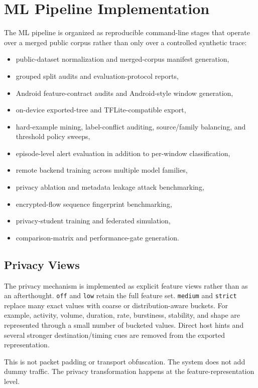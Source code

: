 \section{ML Pipeline Implementation}
The ML pipeline is organized as reproducible command-line stages that operate over a merged public
corpus rather than only over a controlled synthetic trace:
\begin{itemize}[leftmargin=*]
  \item public-dataset normalization and merged-corpus manifest generation,
  \item grouped split audits and evaluation-protocol reports,
  \item Android feature-contract audits and Android-style window generation,
  \item on-device exported-tree and TFLite-compatible export,
  \item hard-example mining, label-conflict auditing, source/family balancing, and threshold policy
  sweeps,
  \item episode-level alert evaluation in addition to per-window classification,
  \item remote backend training across multiple model families,
  \item privacy ablation and metadata leakage attack benchmarking,
  \item encrypted-flow sequence fingerprint benchmarking,
  \item privacy-student training and federated simulation,
  \item comparison-matrix and performance-gate generation.
\end{itemize}

\subsection{Privacy Views}
The privacy mechanism is implemented as explicit feature views rather than as an afterthought.
\texttt{off} and \texttt{low} retain the full feature set. \texttt{medium} and \texttt{strict}
replace many exact values with coarse or distribution-aware buckets. For example, activity, volume,
duration, rate, burstiness, stability, and shape are represented through a small number of bucketed
values. Direct host hints and several stronger destination/timing cues are removed from the
exported representation.

This is not packet padding or transport obfuscation. The system does not add dummy traffic. The
privacy transformation happens at the feature-representation level.

